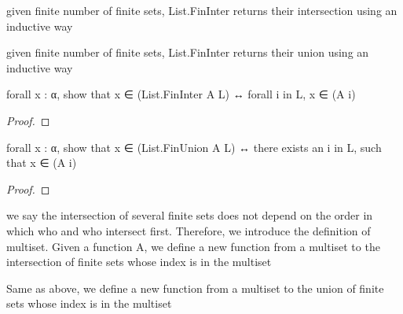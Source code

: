 
\begin{definition}\label{List.FinInter}
        \leanok
                given finite number of finite sets, List.FinInter returns their intersection using an inductive way
    \end{definition}

\begin{definition}\label{List.FinUnion}
        \leanok
                given finite number of finite sets, List.FinInter returns their union using an inductive way
    \end{definition}

\begin{lemma}\label{List.eq_FinInter}
        \leanok
                forall x : α, show that x ∈ (List.FinInter A L) ↔ forall i in L, x ∈ (A i)
    \end{lemma}

\begin{proof}
    \leanok
\end{proof}

\begin{lemma}\label{List.eq_FinUnion}
        \leanok
                forall x : α, show that x ∈ (List.FinUnion A L) ↔ there exists an i in L, such that x ∈ (A i)
    \end{lemma}

\begin{proof}
    \leanok
\end{proof}

\begin{definition}\label{Multiset.FinInter}
        \leanok
                we say the intersection of several finite sets does not depend on the order in which who and who intersect first. Therefore, we introduce the definition of multiset. Given a function A, we define a new function from a multiset to the intersection of finite sets whose index is in the multiset
    \end{definition}

\begin{definition}\label{Multiset.FinUnion}
        \leanok
                Same as above, we define a new function from a multiset to the union of finite sets whose index is in the multiset
    \end{definition}

